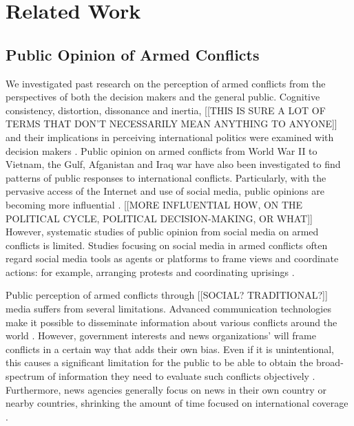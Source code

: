 \section{Related Work}
\subsection{Public Opinion of Armed Conflicts}
We investigated past research on the perception of armed conflicts from the perspectives of both the decision makers and the general public. Cognitive consistency, distortion, dissonance and inertia, [[THIS IS SURE A LOT OF TERMS THAT DON'T NECESSARILY MEAN ANYTHING TO ANYONE]] and their implications in perceiving international politics were examined with decision makers \cite{Jervis1976}. Public opinion on armed conflicts from World War II to Vietnam, the Gulf, Afganistan and Iraq war have also been investigated to find patterns of public responses to international conflicts. Particularly, with the pervasive access of the Internet and use of social media, public opinions are becoming more influential \cite{Shirky2011}. [[MORE INFLUENTIAL HOW, ON THE POLITICAL CYCLE, POLITICAL DECISION-MAKING, OR WHAT]] However, systematic studies of public opinion from social media on armed conflicts is limited. Studies focusing on social media in armed conflicts often regard social media tools as agents or platforms to frame views and coordinate actions: for example, arranging protests and coordinating uprisings \cite{Lim2012}.

Public perception of armed conflicts through [[SOCIAL? TRADITIONAL?]] media suffers from several limitations. Advanced communication technologies make it possible to disseminate information about various conflicts around the world \cite{Sacco2015}. However, government interests and news organizations' will frame  conflicts in a certain way that adds their own bias. Even if it is unintentional, this causes a significant limitation for the public to be able to obtain the broad-spectrum of information they need to evaluate such conflicts objectively \cite{Nelson1997}. Furthermore, news agencies generally focus on news in their own country or nearby countries, shrinking the amount of time focused on international coverage \cite{Seib2004}. 

